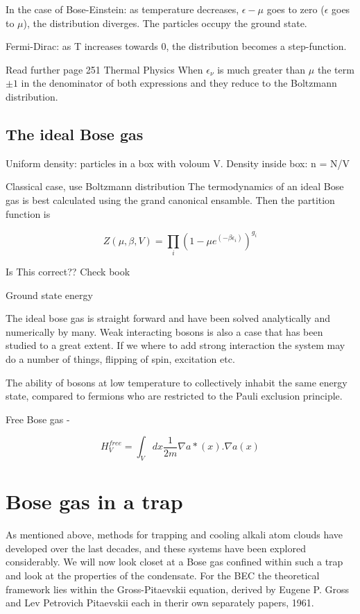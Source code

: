 In the case of Bose-Einstein: as temperature decreases, $\epsilon - \mu$ goes to zero ($\epsilon$ goes to $\mu$), the distribution diverges. The particles occupy the ground state.

Fermi-Dirac: as T increases towards 0, the distribution becomes a step-function.

Read further page 251 Thermal Physics \cite{ThermalPhysics}
When $\epsilon_{\nu}$ is much greater than $\mu$ the term $\pm 1$ in the denominator of both expressions and they reduce to the Boltzmann distribution. 


\subsection{The ideal Bose gas}

Uniform density: particles in a box with voloum V.
Density inside box: n = N/V

Classical case, use Boltzmann distribution
The termodynamics of an ideal Bose gas is best calculated using the grand canonical ensamble. Then the partition function is 

\begin{equation}
Z(\mu, \beta, V) = \prod_i (1 - \mu e^{(-\beta \epsilon_i)})^{g_i}
\end{equation}

Is This correct?? Check book

Ground state energy

The ideal bose gas is straight forward and have been solved analytically and numerically by many. Weak interacting bosons is also a case that has been studied to a great extent. If we where to add strong interaction the system may do a number of things, flipping of spin, excitation etc.


The ability of bosons at low temperature to collectively inhabit the same energy state, compared to fermions who are restricted to the Pauli exclusion principle.

Free Bose gas - 

\begin{equation} \label{eq:hamilt_free_bose_gas}
H^{free}_V = \int_V dx \frac{1}{2m} \nabla a*(x). \nabla a(x)
\end{equation}


\section{Bose gas in a trap}

As mentioned above, methods for trapping and cooling alkali atom clouds have developed over the last decades, and these systems have been explored considerably. We will now look closet at a Bose gas confined within such a trap and look at the properties of the condensate.
For the BEC the theoretical framework lies within the Gross-Pitaevskii equation, derived by Eugene P. Gross and Lev Petrovich Pitaevskii each in therir own separately papers, 1961.


